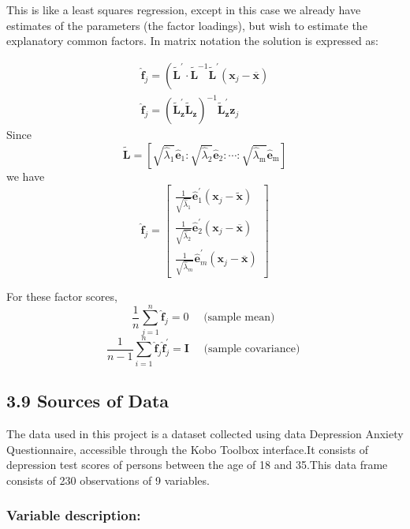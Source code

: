 \documentclass[12pt]{article}
\begin{document}
\noindent This is like a least squares regression, except in this case we already have
estimates of the parameters (the factor loadings), but wish to estimate the
explanatory common factors. In matrix notation the solution is expressed as:

$$
\begin{gathered}
	\hat{\mathbf{f}}_j=\left(\tilde{\mathbf{L}}^{\prime} \cdot \tilde{\mathbf{L}}^{-1} \widetilde{\mathbf{L}}^{\prime}\left(\mathbf{x}_j-\overline{\mathbf{x}}\right)\right. \\
	\hat{\mathbf{f}}_j=\left(\tilde{\mathbf{L}}_{\mathbf{z}}^{\prime} \tilde{\mathbf{L}}_{\mathbf{z}}\right)^{-1} \widetilde{\mathbf{L}}_{\mathbf{z}}^{\prime} \mathbf{z}_j
\end{gathered}
$$
Since 
$$
\tilde{\mathbf{L}}=\left[\sqrt{\hat{\lambda}_1} \hat{\mathbf{e}}_1: \sqrt{\hat{\lambda}_2} \hat{\mathbf{e}}_2: \cdots: \sqrt{\hat{\lambda}_{\mathrm{m}}} \hat{\mathbf{e}}_{\mathrm{m}}\right]
$$
we have
$$
\hat{\mathbf{f}}_j=\left[\begin{array}{c}
	\frac{1}{\sqrt{\hat{\lambda}_1}} \hat{\mathbf{e}}_1^{\prime}\left(\mathbf{x}_j-\tilde{\mathbf{x}}\right) \\
	\frac{1}{\sqrt{\hat{\lambda}_2}} \hat{\mathbf{e}}_2^{\prime}\left(\mathbf{x}_j-\overline{\mathbf{x}}\right) \\
	\frac{1}{\sqrt{\hat{\lambda}_m}} \hat{\mathbf{e}}_m^{\prime}\left(\mathbf{x}_j-\overline{\mathbf{x}}\right)
\end{array}\right]
$$

For these factor scores,
$$
\frac{1}{n} \sum_{j=1}^n \hat{\mathbf{f}}_j=0 \quad \text { (sample mean) }
$$
$$
\frac{1}{n-1} \sum_{i=1}^n \hat{\mathbf{f}}_j \hat{\mathbf{f}}_j^{\prime}=\mathbf{I} \quad \text { (sample covariance) }
$$


\subsection*{3.9 Sources of Data}

The data used in this project is a dataset collected using data Depression Anxiety Questionnaire, accessible through the Kobo Toolbox interface.It consists of depression test scores of persons between the age of 18 and 35.This data frame consists of 230 observations of 9 variables.
\subsubsection*{Variable description:}
\end{document}
